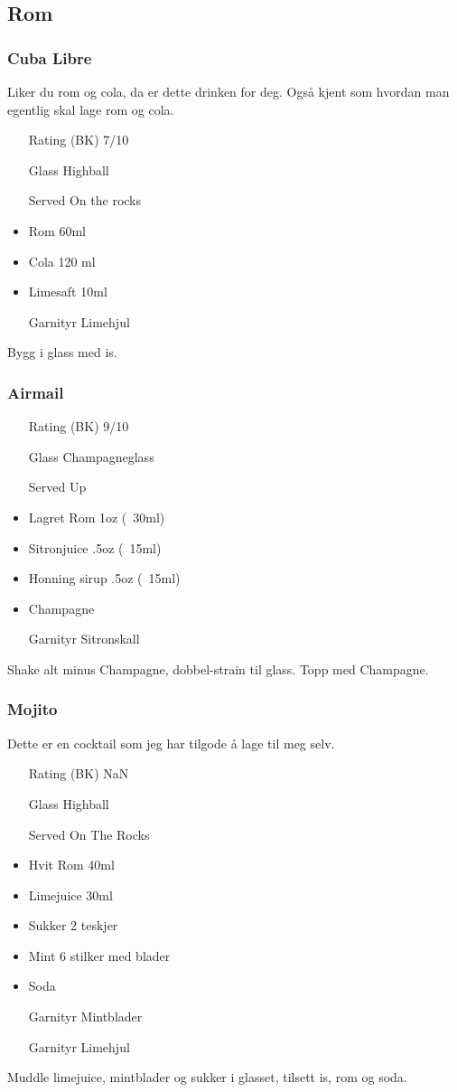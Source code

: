 \subsection{Rom}
\subsubsection{Cuba Libre}
Liker du rom og cola, da er dette drinken for deg. Også kjent som hvordan man egentlig skal lage rom og cola.
\begin{itemize}
    \item[Rating (BK)] 7/10
    \item[Glass] Highball
    \item[Served] On the rocks
    \item Rom 60ml
    \item Cola 120 ml
    \item Limesaft 10ml
    \item[Garnityr] Limehjul
\end{itemize}
Bygg i glass med is.

\subsubsection{Airmail}
\begin{itemize}
    \item[Rating (BK)] 9/10
    \item[Glass] Champagneglass
    \item[Served] Up
    \item Lagret Rom 1oz (~30ml)
    \item Sitronjuice .5oz (~15ml)
    \item Honning sirup .5oz (~15ml)
    \item Champagne
    \item[Garnityr] Sitronskall
\end{itemize}
Shake alt minus Champagne, dobbel-strain til glass. Topp med Champagne.

\subsubsection{Mojito}
Dette er en cocktail som jeg har tilgode å lage til meg selv. 
\begin{itemize}
    \item[Rating (BK)] NaN
    \item[Glass] Highball
    \item[Served] On The Rocks
    \item Hvit Rom 40ml
    \item Limejuice 30ml
    \item Sukker 2 teskjer
    \item Mint 6 stilker med blader
    \item Soda
    \item[Garnityr] Mintblader
    \item[Garnityr] Limehjul
\end{itemize}
Muddle limejuice, mintblader og sukker i glasset, tilsett is, rom og soda.

